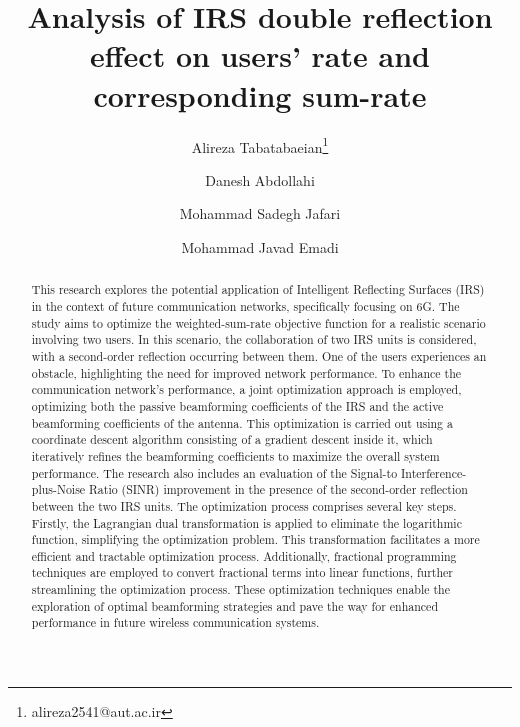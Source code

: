 \documentclass{article}
\title{Analysis of IRS double reflection effect on users' rate and corresponding sum-rate}
\date{}
\author[1]{%
	\hspace{1mm}Alireza Tabatabaeian\thanks{alireza2541@aut.ac.ir}%
}
\author[1]{%
	\hspace{1mm}Danesh Abdollahi
}
\author[1]{%
	\hspace{1mm}Mohammad Sadegh Jafari
}
\author[1]{%
	\hspace{1mm}Mohammad Javad Emadi
}
\affil[1]{Department of Electrical Engineering, Amirkabir University of Technology (Tehran Polytechnic), Tehran, Iran}
\begin{document}
\maketitle

\begin{abstract}
	This research explores the potential application of Intelligent Reflecting Surfaces (IRS) in the context of future communication networks, specifically focusing on 6G.
	The study aims to optimize the weighted-sum-rate objective function for a realistic scenario involving two users.
	In this scenario, the collaboration of two IRS units is considered, with a second-order reflection occurring between them.
	One of the users experiences an obstacle, highlighting the need for improved network performance.
	To enhance the communication network’s performance, a joint optimization approach is employed, optimizing both the passive beamforming coefficients of the IRS and the active beamforming coefficients of the antenna.
	This optimization is carried out using a coordinate descent algorithm consisting of a gradient descent inside it, which iteratively refines the beamforming coefficients to maximize the overall system performance. 
	The research also includes an evaluation of the Signal-to Interference-plus-Noise Ratio (SINR) improvement in the presence of the second-order reflection between the two IRS units.
	The optimization process comprises several key steps.
	Firstly, the Lagrangian dual transformation is applied to eliminate the logarithmic function, simplifying the optimization problem.
	This transformation facilitates a more efficient and tractable optimization process.
	Additionally, fractional programming techniques are employed to convert fractional terms into linear functions, further streamlining the optimization process.
	These optimization techniques enable the exploration of optimal beamforming strategies and pave the way for enhanced performance in future wireless communication systems.
\end{abstract}

\end{document}
